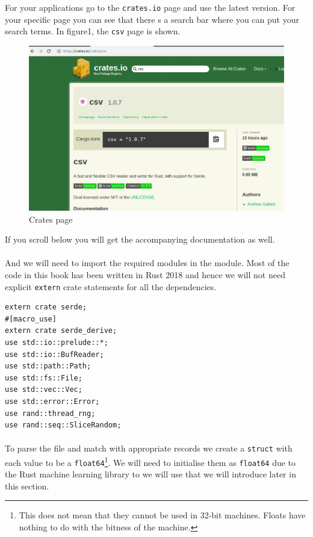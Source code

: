 \documentclass{book}
\begin{document}
For your applications go to the \lstinline{crates.io} page and use the latest version. For your specific page you can see that there s a search bar where you can put your search terms. In figure1, the \lstinline{csv} page is shown.

\begin{figure}[htpb]
	\centering
	\includegraphics[width=0.8\linewidth]{cratesiopage.png}
	\caption{Crates page}
	\label{fig:crates page}
\end{figure}

If you scroll below you will get the accompanying documentation as well.

\paragraph{}%
And we will need to import the required modules in the module. Most of the code in this book has been written in Rust 2018 and hence we will not need explicit \lstinline{extern} crate statements for all the dependencies.
\label{par:import_required_modules}

\begin{lstlisting}[caption={regression}]
extern crate serde;
#[macro_use]
extern crate serde_derive;
use std::io::prelude::*;
use std::io::BufReader;
use std::path::Path;
use std::fs::File;
use std::vec::Vec;
use std::error::Error;
use rand::thread_rng;
use rand::seq::SliceRandom;
\end{lstlisting}

\paragraph{}%
To parse the file and match with appropriate records we create a \lstinline{struct} with each value to be a \lstinline{float64}\footnote{This does not mean that they cannot be used in 32-bit machines. Floats have nothing to do with the bitness of the machine.}. We will need to initialise them as \lstinline{float64} due to the Rust machine learning library to we will use that we will introduce later in this section.
\label{par:}
\end{document}
